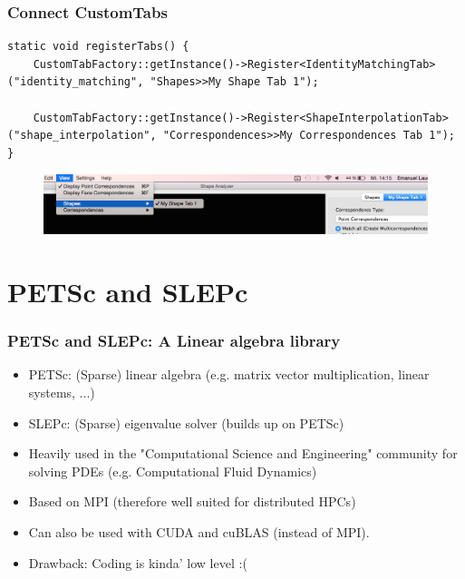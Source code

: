 \documentclass[compress]{beamer}
\begin{document}
\begin{frame}[fragile]
\frametitle{Connect CustomTabs}
\begin{lstlisting}
static void registerTabs() {
    CustomTabFactory::getInstance()->Register<IdentityMatchingTab>("identity_matching", "Shapes>>My Shape Tab 1");

    CustomTabFactory::getInstance()->Register<ShapeInterpolationTab>("shape_interpolation", "Correspondences>>My Correspondences Tab 1");
}
\end{lstlisting}
  \begin{figure}[h]
	\centering
	\includegraphics[width=\textwidth]{tabs.png}
\end{figure}
\end{frame}

\section{PETSc and SLEPc}
\begin{frame}
\frametitle{PETSc and SLEPc: A Linear algebra library}
\begin{itemize}
	\item PETSc: (Sparse) linear algebra (e.g. matrix vector multiplication, linear systems, ...)
	\item SLEPc: (Sparse) eigenvalue solver (builds up on PETSc)
	\item Heavily used in the "Computational Science and Engineering" community for solving PDEs (e.g. Computational Fluid Dynamics)
	\item Based on MPI (therefore well suited for distributed HPCs)
	\item Can also be used with CUDA and cuBLAS (instead of MPI).
	\item Drawback: Coding is kinda' low level :(
\end{itemize}
\end{frame}
\end{document}
